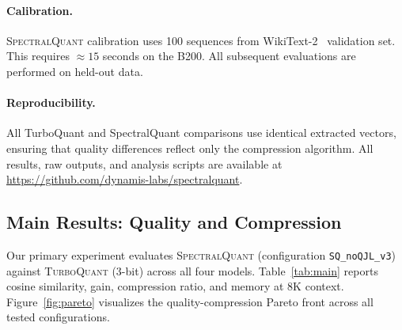 \documentclass[11pt]{article}
\newcommand{\TQ}{\textsc{TurboQuant}}
\newcommand{\SQ}{\textsc{SpectralQuant}}
\begin{document}
\paragraph{Calibration.}
\SQ{} calibration uses 100 sequences from WikiText-2~\citep{merity2016wikitext} validation set.  This
requires $\approx 15$ seconds on the B200.  All subsequent evaluations are
performed on held-out data.

\paragraph{Reproducibility.}
All TurboQuant and SpectralQuant comparisons use identical extracted vectors,
ensuring that quality differences reflect only the compression algorithm.  All
results, raw outputs, and analysis scripts are available at
\url{https://github.com/dynamis-labs/spectralquant}.

\subsection{Main Results: Quality and Compression}
\label{sec:main_results}

Our primary experiment evaluates \SQ{} (configuration \texttt{SQ\_noQJL\_v3})
against \TQ{} (3-bit) across all four models.  Table~\ref{tab:main} reports
cosine similarity, gain, compression ratio, and memory at 8K context.
Figure~\ref{fig:pareto} visualizes the quality-compression Pareto front across
all tested configurations.
\end{document}
